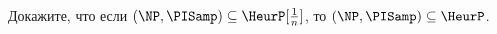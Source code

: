 Докажите, что если $(\NP, \PISamp) \subseteq \HeurP[\frac{1}{n}]$, то
$(\NP, \PISamp) \subseteq \HeurP$.
